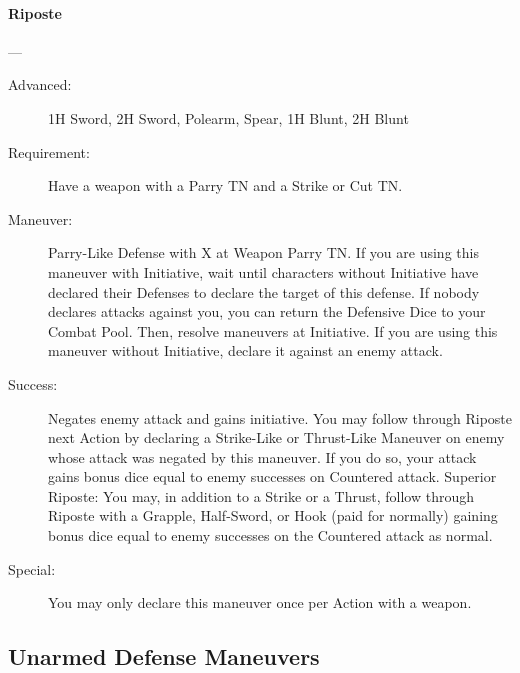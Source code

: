\documentclass[oneside,11pt,english]{book}
\begin{document}
\paragraph{\large\label{man:Riposte}Riposte}---\quad{\large[2+X]}
\vspace{-10pt}\begin{description}
\item [Advanced:] 1H Sword, 2H Sword, Polearm, Spear, 1H Blunt, 2H Blunt %
\item [Requirement:] Have a weapon with a Parry TN and a Strike or Cut TN. 
\item [Maneuver:] Parry-Like Defense with X at Weapon Parry TN. 
If you are using this maneuver with Initiative, wait until characters without Initiative have declared their 
Defenses to declare the target of this defense. If nobody declares attacks against you, you can return the 
Defensive Dice to your Combat Pool. Then, resolve maneuvers at Initiative. 
If you are using this maneuver without Initiative, declare it against an enemy attack. 
\item [Success:] Negates enemy attack and gains initiative. You may follow through Riposte next Action by 
declaring a Strike-Like or Thrust-Like Maneuver on enemy whose attack was negated by this maneuver. 
If you do so, your attack gains bonus dice equal to enemy successes on Countered attack. 
Superior Riposte: You may, in addition to a Strike or a Thrust, follow through Riposte with a Grapple, 
Half-Sword, or Hook (paid for normally) gaining bonus dice equal to enemy successes on the Countered 
attack as normal. 
\item [Special:] You may only declare this maneuver once per Action with a weapon. 
\end{description}

\subsection{Unarmed Defense Maneuvers}
\end{document}
